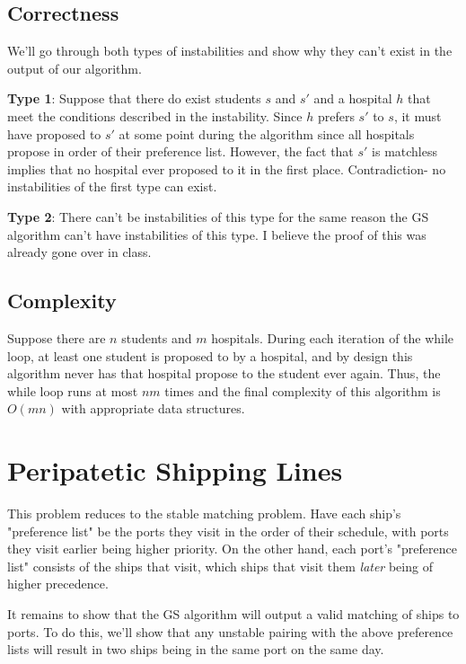 \documentclass[12pt]{article}
\begin{document}
\subsection{Correctness}

We'll go through both types of instabilities and show why they can't exist
in the output of our algorithm.

\textbf{Type 1}:
Suppose that there do exist students $s$ and $s'$ and a hospital $h$
that meet the conditions described in the instability.
Since $h$ prefers $s'$ to $s$, it must have proposed to $s'$ at some point
during the algorithm since all hospitals propose in order of their preference list.
However, the fact that $s'$ is matchless implies that no hospital
ever proposed to it in the first place.
Contradiction- no instabilities of the first type can exist.

\textbf{Type 2}:
There can't be instabilities of this type for the same reason
the GS algorithm can't have instabilities of this type.
I believe the proof of this was already gone over in class.

\subsection{Complexity}

Suppose there are $n$ students and $m$ hospitals.
During each iteration of the while loop, at least one student is proposed to
by a hospital, and by design this algorithm never has that hospital propose
to the student ever again.
Thus, the while loop runs at most $nm$ times and the final complexity
of this algorithm is $O(mn)$ with appropriate data structures.

\section{Peripatetic Shipping Lines}

This problem reduces to the stable matching problem.
Have each ship's "preference list" be the ports they visit in the order of their schedule,
with ports they visit earlier being higher priority.
On the other hand, each port's "preference list" consists of the ships that visit,
which ships that visit them \textit{later} being of higher precedence.

It remains to show that the GS algorithm will output a valid matching of
ships to ports.
To do this, we'll show that any unstable pairing with the above preference
lists will result in two ships being in the same port on the same day.
\end{document}
